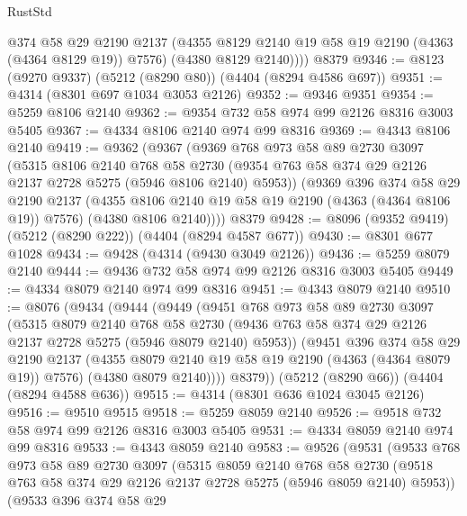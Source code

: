 \begin{lexlean}{RustStd}
\begin{coremodule}
{\begin{coremodule}
{{{{{{{{{{{{{{{{          @374
          @58
          @29
          @2190
          @2137
          (@4355 @8129 @2140 @19 @58 @19 @2190 (@4363 (@4364 @8129 @19)) @7576)
          (@4380 @8129 @2140))))
    @8379
@9346 := @8123 (@9270 @9337) (@5212 (@8290 @80)) (@4404 (@8294 @4586 @697))
@9351 := @4314 (@8301 @697 @1034 @3053 @2126)
@9352 := @9346 @9351
@9354 := @5259 @8106 @2140
@9362 := @9354 @732 @58 @974 @99 @2126 @8316 @3003 @5405
@9367 := @4334 @8106 @2140 @974 @99 @8316
@9369 := @4343 @8106 @2140
@9419 := @9362
    (@9367
      (@9369
        @768
        @973
        @58
        @89
        @2730
        @3097
        (@5315
          @8106
          @2140
          @768
          @58
          @2730
          (@9354 @763 @58 @374 @29 @2126 @2137 @2728 @5275 (@5946 @8106 @2140) @5953))
        (@9369
          @396
          @374
          @58
          @29
          @2190
          @2137
          (@4355 @8106 @2140 @19 @58 @19 @2190 (@4363 (@4364 @8106 @19)) @7576)
          (@4380 @8106 @2140))))
    @8379
@9428 := @8096 (@9352 @9419) (@5212 (@8290 @222)) (@4404 (@8294 @4587 @677))
@9430 := @8301 @677 @1028
@9434 := @9428 (@4314 (@9430 @3049 @2126))
@9436 := @5259 @8079 @2140
@9444 := @9436 @732 @58 @974 @99 @2126 @8316 @3003 @5405
@9449 := @4334 @8079 @2140 @974 @99 @8316
@9451 := @4343 @8079 @2140
@9510 := @8076
    (@9434
      (@9444
        (@9449
          (@9451
            @768
            @973
            @58
            @89
            @2730
            @3097
            (@5315
              @8079
              @2140
              @768
              @58
              @2730
              (@9436 @763 @58 @374 @29 @2126 @2137 @2728 @5275 (@5946 @8079 @2140) @5953))
            (@9451
              @396
              @374
              @58
              @29
              @2190
              @2137
              (@4355 @8079 @2140 @19 @58 @19 @2190 (@4363 (@4364 @8079 @19)) @7576)
              (@4380 @8079 @2140))))
        @8379))
    (@5212 (@8290 @66))
    (@4404 (@8294 @4588 @636))
@9515 := @4314 (@8301 @636 @1024 @3045 @2126)
@9516 := @9510 @9515
@9518 := @5259 @8059 @2140
@9526 := @9518 @732 @58 @974 @99 @2126 @8316 @3003 @5405
@9531 := @4334 @8059 @2140 @974 @99 @8316
@9533 := @4343 @8059 @2140
@9583 := @9526
    (@9531
      (@9533
        @768
        @973
        @58
        @89
        @2730
        @3097
        (@5315
          @8059
          @2140
          @768
          @58
          @2730
          (@9518 @763 @58 @374 @29 @2126 @2137 @2728 @5275 (@5946 @8059 @2140) @5953))
        (@9533
          @396
          @374
          @58
          @29
}}}}}}}}}}}}}}}}
\end{coremodule}}
\end{coremodule}
\end{lexlean}
